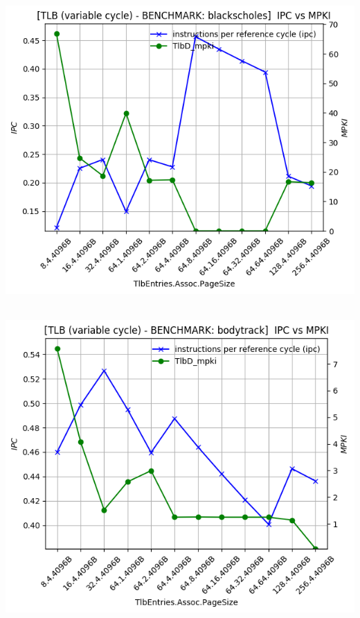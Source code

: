 \begin{minipage}{\textwidth}
    \begin{center}
        \\
        \vspace{3mm}
        \includegraphics[scale=0.65]{graphs/TLB/var/blackscholes.png}
        \vspace{6mm}
    \end{center}
\end{minipage}


\begin{minipage}{\textwidth}
    \begin{center}
        \\
        \vspace{3mm}
        \includegraphics[scale=0.65]{graphs/TLB/var/bodytrack.png}
        \vspace{6mm}
    \end{center}
\end{minipage}

